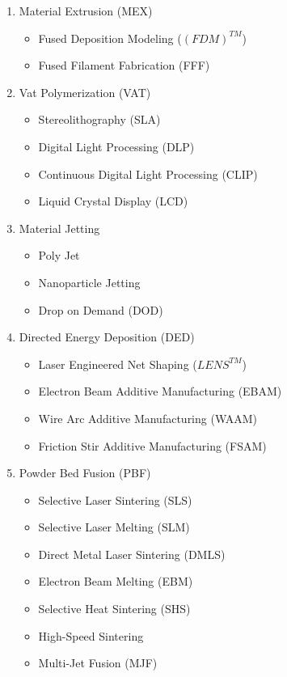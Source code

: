 \documentclass{article}
\begin{document}
\begin{enumerate}
    \item Material Extrusion (MEX)
    \begin{itemize}
        \item Fused Deposition Modeling ($(FDM)^{TM}$)
        \item Fused Filament Fabrication (FFF)
    \end{itemize}
    \item Vat Polymerization (VAT)
    \begin{itemize}
        \item Stereolithography (SLA)
        \item Digital Light Processing (DLP)
        \item Continuous Digital Light Processing (CLIP)
        \item Liquid Crystal Display (LCD)
    \end{itemize}
    \item Material Jetting
    \begin{itemize}
        \item Poly Jet
        \item Nanoparticle Jetting
        \item Drop on Demand (DOD)
    \end{itemize}
    \item Directed Energy Deposition (DED)
    \begin{itemize}
        \item Laser Engineered Net Shaping ($LENS^{TM}$)
        \item Electron Beam Additive Manufacturing (EBAM)
        \item Wire Arc Additive Manufacturing (WAAM)
        \item Friction Stir Additive Manufacturing (FSAM)
    \end{itemize}
    \item Powder Bed Fusion (PBF)
    \begin{itemize}
        \item Selective Laser Sintering (SLS)
        \item Selective Laser Melting (SLM)
        \item Direct Metal Laser Sintering (DMLS)
        \item Electron Beam Melting (EBM)
        \item Selective Heat Sintering (SHS)
        \item High-Speed Sintering
        \item Multi-Jet Fusion (MJF)

\end{itemize}
\end{enumerate}
\end{document}
